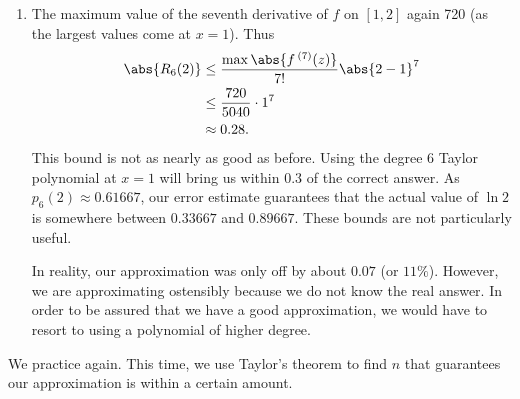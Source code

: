 \begin{example}
\begin{enumerate}
	\item	%
	The maximum value of the seventh derivative of $f$ on $[1,2]$ %
	again 720 (as the largest values come at $x=1$). Thus 
\begin{align*}
	\abs{R_6(2)}
	&\leq \frac{\max\abs{f\,^{(7)}(z)}}{7!}\abs{2-1}^7\\
	&\leq \frac{720}{5040}\cdot1^7\\
	&\approx 0.28.
\end{align*}
This bound is not as nearly as good as before. Using the degree 6 Taylor polynomial at $x =1$ will bring us within 0.3 of the correct answer. As $p_6(2)\approx 0.61667$, our error estimate guarantees that the actual value of $\ln 2$ is somewhere between $0.33667$ and $0.89667$. These bounds are not particularly useful.

In reality, our approximation was only off by about $0.07$ (or $11\%$). However, we are approximating ostensibly because we do not know the real answer. In order to be assured that we have a good approximation, we would have to resort to using a polynomial of higher degree.
\end{enumerate}
\end{example}

We practice again. This time, we use Taylor's theorem to find $n$ that guarantees our approximation is within a certain amount.

